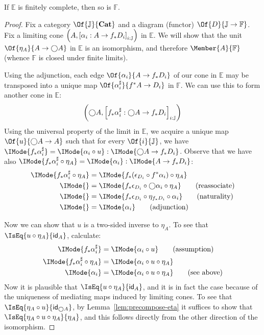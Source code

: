 \documentclass{article}
\newcommand\AIsEq[2]{\IMode{#1} &=\IMode{#2}}
\newcommand\Cats{\mathbf{Cat}}
\newcommand\ArrId[1]{\mathsf{id}_{#1}}
\newcommand\IsEqOf[3]{\IMode{#1}=\IMode{#2}:\IMode{#3}}
\begin{document}
\begin{lem}
  If $\mathbb{E}$ is finitely complete, then so is $\mathbb{F}$.
\end{lem}
\begin{proof}
  Fix a category $\Of{\mathbb{J}}{\Cats}$ and a diagram (functor)
  $\Of{D}{\mathbb{J}\to\mathbb{F}}$. Fix a limiting cone
  $\left(A,{\left[\alpha_i:A\to f_*D_i\right]}_{i:\mathbb{J}}\right)$ in $\mathbb{E}$.
  We will show that the unit $\Of{\eta_A}{A\to \bigcirc A}$ in
  $\mathbb{E}$ is an isomorphism, and therefore
  $\Member{A}{\mathbb{F}}$ (whence $\mathbb{F}$ is closed under finite
  limits).

  Using the adjunction, each edge $\Of{\alpha_i}{A\to f_*D_i}$ of our
  cone in $\mathbb{E}$ may be transposed into a unique map
  $\Of{\alpha_i^\sharp}{f^*A\to D_i}$ in $\mathbb{F}$.
%
  We can use this to form another cone in $\mathbb{E}$:
  \[
    \left(\bigcirc A,{\left[f_*\alpha_i^\sharp:\bigcirc A\to f_*D_i\right]}_{i:\mathbb{J}}\right)
  \]
  Using the universal property of the limit in $\mathbb{E}$, we
  acquire a unique map $\Of{u}{\bigcirc A\to A}$ such that for every
  $\Of{i}{\mathbb{J}}$, we have
  $\IsEqOf{f_*\alpha_i^\sharp}{\alpha_i\circ u}{\bigcirc A\to
    f_*D_i}$.
%
  Observe that we have also
  $\IsEqOf{f_*\alpha_i^\sharp\circ\eta_A}{\alpha_i}{A\to f_*D_i}$:
  \begin{align*}
    \AIsEq{
      f_*\alpha_i^\sharp\circ\eta_A
    }{
      f_*(\epsilon_{D_i}\circ f^*\alpha_i)\circ\eta_A
    }
    \\
    \AIsEq{
    }{
      f_*\epsilon_{D_i}\circ\bigcirc\alpha_i\circ\eta_A
    }\tag{reassociate}
    \\
    \AIsEq{
    }{
      f_*\epsilon_{D_i}\circ\eta_{f_*D_i}\circ\alpha_i
    }\tag{naturality}
    \\
    \AIsEq{
    }{
      \alpha_i
    }\tag{adjunction}
  \end{align*}

  Now we can show that $u$ is a two-sided inverse to $\eta_A$. To see
  that $\IsEq{u\circ\eta_A}{\ArrId{A}}$, calculate:
  \begin{align*}
    \AIsEq{
      f_*\alpha_i^\sharp
    }{
      \alpha_i\circ u
    }\tag{assumption}
    \\
    \AIsEq{
      f_*\alpha_i^\sharp\circ \eta_A
    }{
      \alpha_i\circ u\circ\eta_A
    }
    \\
    \AIsEq{
      \alpha_i
    }{
      \alpha_i\circ u\circ\eta_A
    }\tag{see above}
  \end{align*}
  Now it is plausible that $\IsEq{u\circ\eta_A}{\ArrId{A}}$, and it is
  in fact the case because of the uniqueness of mediating maps induced
  by limiting cones.
%
  To see that $\IsEq{\eta_A\circ u}{\ArrId{\bigcirc A}}$, by
  Lemma~\ref{lem:precompose-eta} it suffices to show that
  $\IsEq{\eta_A\circ u\circ\eta_A}{\eta_A}$, and this follows directly
  from the other direction of the isomorphism.
\end{proof}
\end{document}
